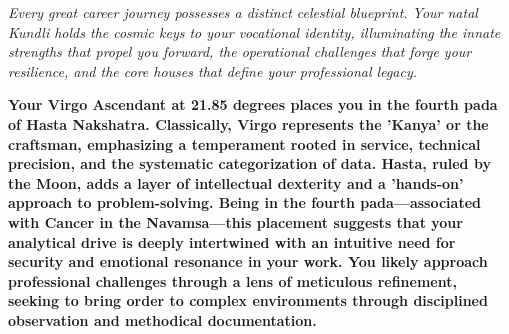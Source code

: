 


{\fontsize{9.5}{14}\selectfont\color{DeepSlate}\itshape Every great career journey possesses a distinct celestial blueprint. Your natal Kundli holds the cosmic keys to your vocational identity, illuminating the innate strengths that propel you forward, the operational challenges that forge your resilience, and the core houses that define your professional legacy.}\par\vspace{3.5mm}

\label{topic7}

{\fontsize{9.5}{13.8}\selectfont\bfseries\color{DeepSlate} Your Virgo Ascendant at 21.85 degrees places you in the fourth pada of Hasta Nakshatra. Classically, Virgo represents the 'Kanya' or the craftsman, emphasizing a temperament rooted in service, technical precision, and the systematic categorization of data. Hasta, ruled by the Moon, adds a layer of intellectual dexterity and a 'hands-on' approach to problem-solving. Being in the fourth pada---associated with Cancer in the Navamsa---this placement suggests that your analytical drive is deeply intertwined with an intuitive need for security and emotional resonance in your work. You likely approach professional challenges through a lens of meticulous refinement, seeking to bring order to complex environments through disciplined observation and methodical documentation.}\par\vspace{2mm}

